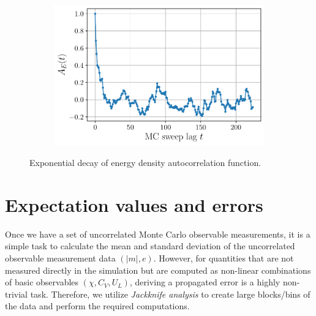 \documentclass[../thesis_main.tex]{subfiles}
\begin{document}
\begin{figure}[!htb]
    \centering
    \begin{subfigure}[b]{0.55\textwidth}  %
        \centering
        \includegraphics[width=\textwidth]{images/monte_carlo/autocorrfn.pdf}
    \end{subfigure}
    \caption{Exponential decay of energy density autocorrelation function.}
    \label{}
\end{figure}
\section{Expectation values and errors}
Once we have a set of uncorrelated Monte Carlo observable measurements, it is a simple task to calculate the mean and standard deviation of the uncorrelated observable measurement data $(|m|, e)$. However, for quantities that are not measured directly in the simulation but are computed as non-linear combinations of basic observables $(\chi, C_V, U_L)$, deriving a propagated error is a highly non-trivial task. Therefore, we utilize \textit{Jackknife analysis} to create large blocks/bins of the data and perform the required computations.
\end{document}
